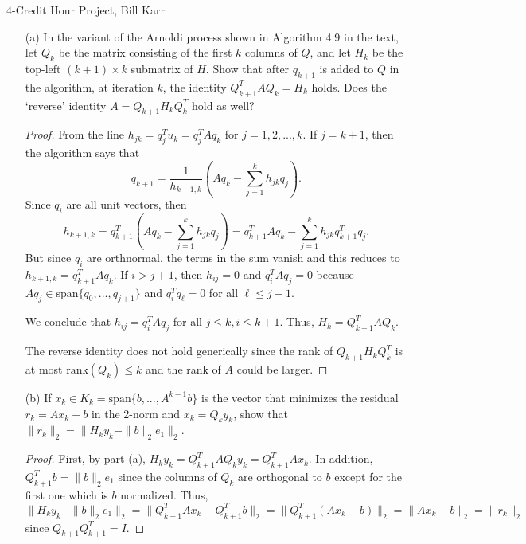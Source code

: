 \documentclass[10pt]{article}
\begin{document}
%
{4-Credit Hour Project, Bill Karr}


\begin{itemize}

\item[(a)] In the variant of the Arnoldi process shown in Algorithm 4.9 in the text, let $ Q_k $ be the matrix consisting of the first $k$ columns of $Q$, and let $ H_{k} $ be the top-left $(k+1) \times k$ submatrix of $H$. Show that after $q_{k+1}$ is added to $Q$ in the algorithm, at iteration $k$, the identity $ Q_{k+1}^T A Q_k = H_k $ holds. Does the `reverse' identity $ A = Q_{k+1} H_k Q_{k}^T $ hold as well?

\begin{proof}
From the line $ h_{jk} = q_j^T u_k = q_j^T A q_k $ for $ j = 1,2, ..., k $. If $ j = k+1 $, then the algorithm says that $$
q_{k+1} = \frac{1}{h_{k+1,k}} \left( Aq_k - \sum_{j = 1}^k h_{jk} q_j \right).
$$ Since $q_i$ are all unit vectors, then $$
 h_{k+1,k} = q_{k+1}^T \left( Aq_k - \sum_{j = 1}^k h_{jk} q_j \right) = 
 q_{k+1}^T Aq_k - \sum_{j = 1}^k h_{jk} q_{k+1}^T q_j .
$$ But since $ q_i $ are orthnormal, the terms in the sum vanish and this reduces to $ h_{k+1,k} =  q_{k+1}^T Aq_k.$ If $ i > j+1 $, then $h_{ij} = 0$ and $
q_{i}^T Aq_j = 0 $ because $ Aq_j \in \text{span} \{ q_0 , ... , q_{j+1} \} $ and $ q_i^T q_\ell = 0 $ for all $ \ell \leq j+1$.

We conclude that $ h_{ij} = q_i^T A q_j $ for all $ j \leq k, i \leq k+1 $. Thus, $ H_k = Q_{k+1}^T A Q_k $. 

The reverse identity does not hold generically since the rank of $ Q_{k+1} H_k Q_{k}^T $ is at most $ \text{rank}(Q_k) \leq k$ and the rank of $A$ could be larger.
\end{proof}

\item[(b)] If $ x_k \in K_k = \text{span} \{ b, ... , A^{k-1} b \} $ is the vector that minimizes the residual $ r_k = Ax_k - b $ in the 2-norm and $ x_k = Q_k y_k $, show that $ \| r_k \|_2 = \| H_k y_k - \| b \|_2 e_1 \|_2 $. 

\begin{proof}
First, by part (a), $ H_k y_k = Q_{k+1}^T A Q_k y_k = Q_{k+1}^T A x_k $. In addition, $ Q_{k+1}^T b = \| b \|_2 e_1 $ since the columns of $Q_k$ are orthogonal to $b$ except for the first one which is $b$ normalized. Thus, $$
\| H_k y_k - \| b \|_2 e_1 \|_2 = \| Q_{k+1}^T A x_k - Q_{k+1}^T b \|_2 = \| Q_{k+1}^T ( A x_k - b ) \|_2 = \| A x_k - b \|_2 = \| r_k \|_2 $$ since $ Q_{k+1} Q_{k+1}^T = I $.
\end{proof}


\end{itemize}
\end{document}
